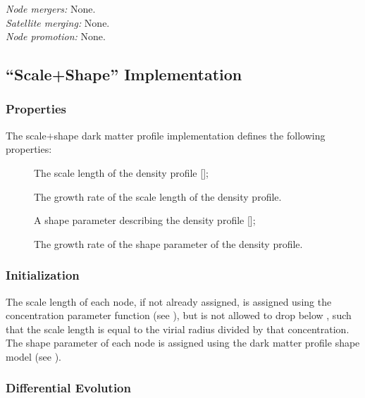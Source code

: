 \noindent\emph{Node mergers:} None.\\

\noindent\emph{Satellite merging:} None.\\

\noindent\emph{Node promotion:} None.\\

\subsection{``Scale+Shape'' Implementation}\label{sec:DarkMatterProfileScaleShape}

\subsubsection{Properties}

The scale$+$shape dark matter profile implementation defines the following properties:
\begin{description}
 \item [] The scale length of the density profile [];
 \item [] The growth rate of the scale length of the density profile.
 \item [] A shape parameter describing the density profile [];
 \item [] The growth rate of the shape parameter of the density profile.
\end{description}

\subsubsection{Initialization}

The scale length of each node, if not already assigned, is assigned using the concentration parameter function (see ), but is not allowed to drop below \mono{[darkMatterProfileMinimumConcentration]}, such that the scale length is equal to the virial radius divided by that concentration. The shape parameter of each \gls{node} is assigned using the dark matter profile shape model (see ).

\subsubsection{Differential Evolution}

